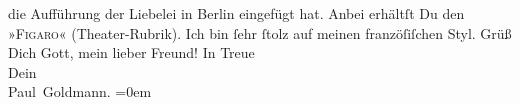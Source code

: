 \begin{ledgroupsized}[t]{13cm}
{{{                     die Aufführung der Liebelei in Berlin eingefügt hat.}}}\label{K_L02767-4h} Anbei erhältſt Du den »\textsc{Figaro}« (Theater-Rubrik). Ich bin ſehr {\pb}ſtolz auf
               meinen franzöſiſchen Styl.\pend
           \pstart
           Grüß Dich Gott, mein lieber Freund!\pend
           \pstart
           In Treue {\\[\baselineskip]}Dein {\\[\baselineskip]}\spacefill\mbox{Paul Goldmann.}\pend
           \leftskip=0em{}
         
         \endnumbering{}\end{ledgroupsized}  \newcommand{\dateiname}{L02767}\newcommand{\titel}{Paul Goldmann an Arthur Schnitzler, 6. 2. [1896]}\newcommand{\editorInnen}{Martin Anton Müller und Laura Untner}
      
